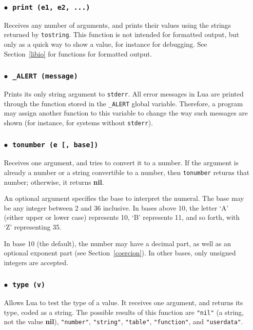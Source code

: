 \documentclass[11pt]{article}
\newcommand{\See}[1]{Section~\ref{#1}}
\newcommand{\see}[1]{(see \See{#1})}
\newcommand{\T}[1]{{\tt #1}}
\newcommand{\nil}{{\bf nil}}
\newcommand{\IndexVerb}[1]{\T{#1}\index{#1}}
\newcommand{\Deffunc}[1]{\index{#1}}
\newcommand{\ff}{$\bullet$\ }
\begin{document}
\subsubsection*{\ff \T{print (e1, e2, ...)}}\Deffunc{print}
Receives any number of arguments,
and prints their values using the strings returned by \verb|tostring|.
This function is not intended for formatted output,
but only as a quick way to show a value,
for instance for debugging.
See \See{libio} for functions for formatted output.

\subsubsection*{\ff \T{_ALERT (message)}}\Deffunc{alert}\label{alert}
Prints its only string argument to \IndexVerb{stderr}.
All error messages in Lua are printed through the function stored
in the \verb|_ALERT| global variable.
Therefore, a program may assign another function to this variable
to change the way such messages are shown
(for instance, for systems without \verb|stderr|).

\subsubsection*{\ff \T{tonumber (e [, base])}}\Deffunc{tonumber}
Receives one argument,
and tries to convert it to a number.
If the argument is already a number or a string convertible
to a number, then \verb|tonumber| returns that number;
otherwise, it returns \nil.

An optional argument specifies the base to interpret the numeral.
The base may be any integer between 2 and 36 inclusive.
In bases above  10, the letter `A' (either upper or lower case)
represents 10, `B' represents 11, and so forth, with `Z' representing 35.

In base 10 (the default), the number may have a decimal part,
as well as an optional exponent part \see{coercion}.
In other bases, only unsigned integers are accepted.

\subsubsection*{\ff \T{type (v)}}\Deffunc{type}\label{pdf-type}
Allows Lua to test the type of a value.
It receives one argument, and returns its type, coded as a string.
The possible results of this function are
\verb|"nil"| (a string, not the value \nil),
\verb|"number"|,
\verb|"string"|,
\verb|"table"|,
\verb|"function"|,
and \verb|"userdata"|.
\end{document}
